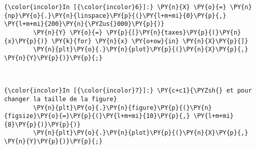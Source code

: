     \begin{Verbatim}[commandchars=\\\{\},frame=single,framerule=0.3mm,rulecolor=\color{cellframecolor}]
{\color{incolor}In [{\color{incolor}6}]:} \PY{n}{X} \PY{o}{=} \PY{n}{np}\PY{o}{.}\PY{n}{linspace}\PY{p}{(}\PY{l+m+mi}{0}\PY{p}{,} \PY{l+m+mi}{200}\PY{n}{\PYZus{}000}\PY{p}{)}
        \PY{n}{Y} \PY{o}{=} \PY{p}{[}\PY{n}{taxes}\PY{p}{(}\PY{n}{x}\PY{p}{)} \PY{k}{for} \PY{n}{x} \PY{o+ow}{in} \PY{n}{X}\PY{p}{]}
        \PY{n}{plt}\PY{o}{.}\PY{n}{plot}\PY{p}{(}\PY{n}{X}\PY{p}{,} \PY{n}{Y}\PY{p}{)}\PY{p}{;}
\end{Verbatim}


    \begin{center}
    \end{center}
    { \hspace*{\fill} \\}
    
    \begin{Verbatim}[commandchars=\\\{\},frame=single,framerule=0.3mm,rulecolor=\color{cellframecolor}]
{\color{incolor}In [{\color{incolor}7}]:} \PY{c+c1}{\PYZsh{} et pour changer la taille de la figure}
        \PY{n}{plt}\PY{o}{.}\PY{n}{figure}\PY{p}{(}\PY{n}{figsize}\PY{o}{=}\PY{p}{(}\PY{l+m+mi}{10}\PY{p}{,} \PY{l+m+mi}{8}\PY{p}{)}\PY{p}{)}
        \PY{n}{plt}\PY{o}{.}\PY{n}{plot}\PY{p}{(}\PY{n}{X}\PY{p}{,} \PY{n}{Y}\PY{p}{)}\PY{p}{;}
\end{Verbatim}


    \begin{center}
    \end{center}
    { \hspace*{\fill} \\}
    

    
    
    
